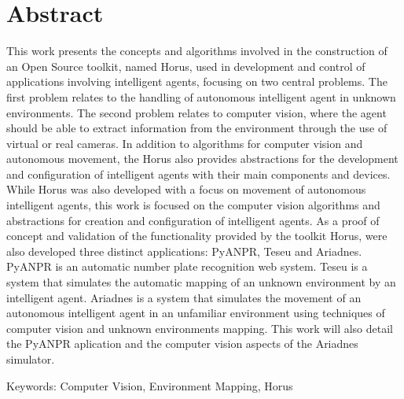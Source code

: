 

\chapter*{Abstract}
This work presents the concepts and algorithms involved in the construction of an Open Source toolkit, named Horus, used in development and control of applications involving intelligent agents, focusing on two central problems. The first problem relates to the handling of autonomous intelligent agent in unknown environments. The second problem relates to computer vision, where the agent should be able to extract information from the environment through the use of virtual or real cameras. In addition to algorithms for computer vision and autonomous movement, the Horus also provides abstractions for the development and configuration of intelligent agents with their main components and devices. While Horus was also developed with a focus on movement of autonomous intelligent agents, this work is focused on the computer vision algorithms and abstractions for creation and configuration of intelligent agents. As a proof of concept and validation of the functionality provided by the toolkit Horus, were also developed three distinct applications: PyANPR, Teseu and Ariadnes. PyANPR is an automatic number plate recognition web system. Teseu is a system that simulates the automatic mapping of an unknown environment by an intelligent agent. Ariadnes is a system that simulates the movement of an autonomous intelligent agent in an unfamiliar environment using techniques of computer vision and unknown environments mapping. This work will also detail the PyANPR aplication and the computer vision aspects of the Ariadnes simulator.


\vspace{0.5cm}

Keywords: Computer Vision, Environment Mapping, Horus

